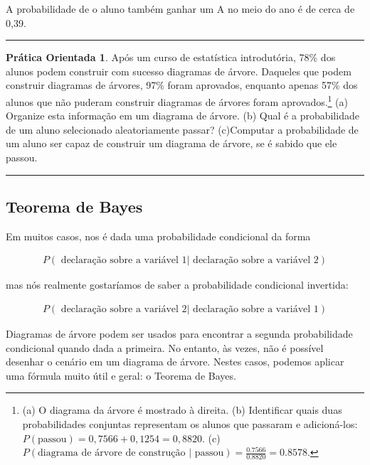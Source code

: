 \documentclass[
]{book}
\theoremstyle{definition}
\theoremstyle{definition}
\theoremstyle{definition}
\newtheorem{exercise}{Prática Orientada}[chapter]
\theoremstyle{definition}
\theoremstyle{remark}
\begin{document}
A probabilidade de o aluno também ganhar um A no meio do ano é de cerca de 0,39.

\begin{center}\rule{0.5\linewidth}{0.5pt}\end{center}

\begin{exercise}
\protect\hypertarget{exr:unnamed-chunk-66}{}{\label{exr:unnamed-chunk-66} }Após um curso de estatística introdutória, 78\% dos alunos podem construir com sucesso diagramas de árvore. Daqueles que podem construir diagramas de árvores, 97\% foram aprovados, enquanto apenas 57\% dos alunos que não puderam construir diagramas de árvores foram aprovados.\footnote{(a) O diagrama da árvore é mostrado à direita. (b) Identificar quais duas probabilidades conjuntas representam os alunos que passaram e adicioná-los: \(P(\text{passou}) = 0,7566+0,1254= 0,8820\). (c) \(P(\text{diagrama de árvore de construção | passou}) = \frac{0.7566}{0.8820} = 0.8578\).}
(a) Organize esta informação em um diagrama de árvore.
(b) Qual é a probabilidade de um aluno selecionado aleatoriamente passar?
(c)Computar a probabilidade de um aluno ser capaz de construir um diagrama de árvore, se é sabido que ele passou.
\end{exercise}

\begin{center}\rule{0.5\linewidth}{0.5pt}\end{center}

\hypertarget{bayesTheoremSubsection}{%
\subsection{Teorema de Bayes}\label{bayesTheoremSubsection}}

Em muitos casos, nos é dada uma probabilidade condicional da forma

\begin{align*}
P(\text{ declaração sobre a variável 1} | \text{ declaração sobre a variável 2})
\end{align*}

mas nós realmente gostaríamos de saber a probabilidade condicional invertida:

\begin{align*}
P(\text{ declaração sobre a variável 2} | \text{ declaração sobre a variável 1})
\end{align*}

Diagramas de árvore podem ser usados para encontrar a segunda probabilidade condicional quando dada a primeira. No entanto, às vezes, não é possível desenhar o cenário em um diagrama de árvore. Nestes casos, podemos aplicar uma fórmula muito útil e geral: o Teorema de Bayes.
\end{document}
